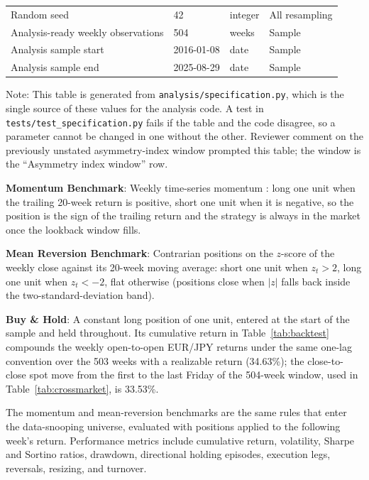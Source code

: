 \documentclass[11pt]{article}
\begin{document}
\begin{table}[H]
\begin{tabular}{@{}llll@{}}
Random seed & 42 & integer & All resampling \\
Analysis-ready weekly observations & 504 & weeks & Sample \\
Analysis sample start & 2016-01-08 & date & Sample \\
Analysis sample end & 2025-08-29 & date & Sample \\
\bottomrule
\end{tabular}
\par\vspace{0.3em}
\parbox{\linewidth}{\footnotesize Note: This table is generated from \texttt{analysis/specification.py}, which is the single source of these values for the analysis code. A test in \texttt{tests/test\_specification.py} fails if the table and the code disagree, so a parameter cannot be changed in one without the other. Reviewer comment on the previously unstated asymmetry-index window prompted this table; the window is the ``Asymmetry index window'' row.}
\end{table}

\textbf{Momentum Benchmark}: Weekly time-series momentum \citep{moskowitz2012time}: long one unit when the trailing 20-week return is positive, short one unit when it is negative, so the position is the sign of the trailing return and the strategy is always in the market once the lookback window fills.

\textbf{Mean Reversion Benchmark}: Contrarian positions on the $z$-score of the weekly close against its 20-week moving average: short one unit when $z_t > 2$, long one unit when $z_t < -2$, flat otherwise (positions close when $|z|$ falls back inside the two-standard-deviation band).

\textbf{Buy \& Hold}: A constant long position of one unit, entered at the start of the sample and held throughout. Its cumulative return in Table~\ref{tab:backtest} compounds the weekly open-to-open EUR/JPY returns under the same one-lag convention over the 503 weeks with a realizable return (34.63\%); the close-to-close spot move from the first to the last Friday of the 504-week window, used in Table~\ref{tab:crossmarket}, is 33.53\%.

The momentum and mean-reversion benchmarks are the same rules that enter the data-snooping universe, evaluated with positions applied to the following week's return. Performance metrics include cumulative return, volatility, Sharpe and Sortino ratios, drawdown, directional holding episodes, execution legs, reversals, resizing, and turnover.
\end{document}
